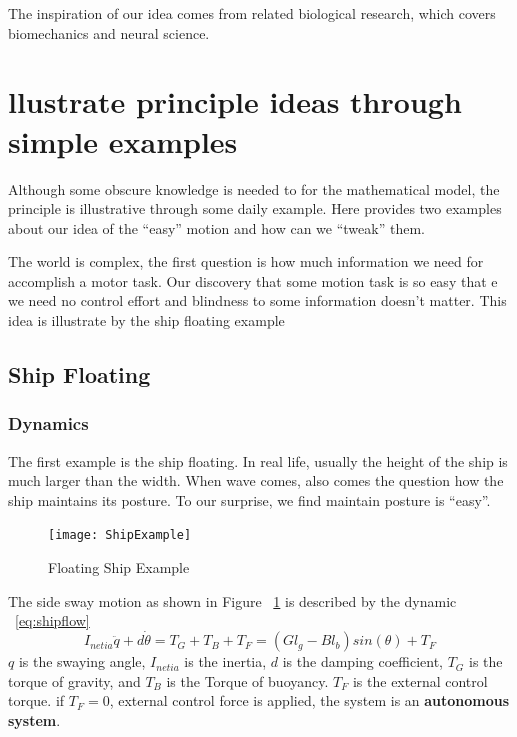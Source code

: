 The inspiration of our idea comes from related biological research, which covers biomechanics and neural science.

\section{llustrate principle ideas through simple examples}

Although some obscure knowledge is needed to for the mathematical model, the principle is illustrative through some daily example. 
Here provides two examples about our idea of the “easy” motion and how can we “tweak” them.

The world is complex, the first question is how much information we need for accomplish a motor task. 
Our discovery that some motion task is so easy that e we need no control effort and blindness to some information doesn’t matter.
This idea is illustrate by the ship floating example

\subsection{Ship Floating}


\subsubsection*{Dynamics}
The first example is the ship floating. 
In real life, usually the height of the ship is much larger than the width. 
When wave comes, also comes the question how the ship maintains its posture.
To our surprise, we find maintain posture is “easy”.



\begin{figure}[!htbp]
  \begin{center}
    \texttt{[image: ShipExample]}
    \caption{Floating Ship Example}
    \label{fig:ShipFloating}
  \end{center}
\end{figure}



The side sway motion as shown in Figure ~\ref{fig:ShipFloating} is described by the dynamic ~\ref{eq:shipflow}
\begin{equation}
I_{netia}\ddot{q}+d\dot{\theta}=T_{G}+T_{B}+T_{F}=(Gl_{g}-Bl_{b})sin(\theta)+T_{F}
\label{eq:shipflow}
\end{equation}
$q$ is the swaying angle,
$I_{netia}$ is the inertia,  
$d$ is the damping coefficient,
$T_{G}$ is the torque of gravity, and $T_{B}$ is the Torque of buoyancy.
$T_{F}$ is the external control torque.
if $T_{F}=0$, external control force is applied, the system is an \textbf{autonomous system}.





